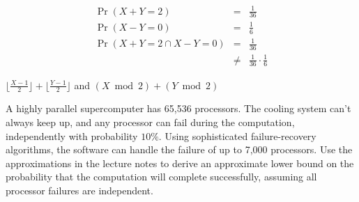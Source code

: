 \documentclass[11pt, twoside]{article}
\begin{document}
\begin{problems}
\begin{problemparts}
{\begin{eqnarray*}
\Pr(X + Y = 2)  & = &   \frac{1}{36} \\
\Pr(X - Y = 0)  & = &   \frac{1}{6} \\
\Pr(X + Y = 2 \cap X - Y = 0)
                & = &   \frac{1}{36} \\
                & \neq &        \frac{1}{36} \cdot \frac{1}{6}
\end{eqnarray*}
}

\problempart $\lfloor\frac{X-1}{2}\rfloor +
\lfloor\frac{Y-1}{2}\rfloor$ and $(X \bmod 2) + (Y \bmod 2)$


\end{problemparts}

\problem   {} %

A highly parallel supercomputer has 65,536 processors.  The cooling
system can't always keep up, and any processor can fail during the
computation, independently with probability $10\%$.  Using
sophisticated failure-recovery algorithms, the software can handle the
failure of up to 7,000 processors.  Use the approximations in the
lecture notes to derive an approximate lower bound on the probability
that the computation will complete successfully, assuming all
processor failures are independent.


\end{problems}
\end{document}
